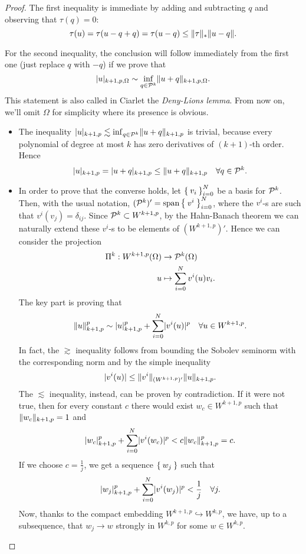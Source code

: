 \begin{proof}
The first inequality is immediate by adding and subtracting $q$ and observing that $\tau(q)=0$:
\[
\tau(u) = \tau(u-q+q) = \tau(u-q) \le \norm{\tau}_* \norm{u-q}.
\]

For the second inequality, the conclusion will follow immediately from the first one (just replace $q$ with $-q$) if we prove that
\[
\abs{u}_{k+1,p,\Omega} \sim \inf_{q \in \P^k} \norm{u+q}_{k+1,p,\Omega}.
\]
This statement is also called in Ciarlet \cite{ciarlet78} the \emph{Deny-Lions lemma}. From now on, we'll omit $\Omega$ for simplicity where its presence is obvious.
\begin{itemize}
\item The inequality $\abs{u}_{k+1,p} \lesssim \inf_{q \in \P^k} \norm{u+q}_{k+1,p}$ is trivial, because every polynomial of degree at most $k$ has zero derivatives of $(k+1)$-th order. Hence
\[
\abs{u}_{k+1,p} = \abs{u+q}_{k+1,p} \le \norm{u+q}_{k+1,p} \quad \forall q \in \P^k.
\]
\item In order to prove that the converse holds, let $\Set{v_i}_{i=0}^N$ be a basis for $\P^k$. Then, with the usual notation, $(\P^k)'=\Span\Set{v^i}_{i=0}^N$, where the $v^i$-s are such that $v^i(v_j)=\delta_{ij}$. Since $\P^k \subset W^{k+1,p}$, by the Hahn-Banach theorem we can naturally extend these $v^i$-s to be elements of $(W^{k+1,p})'$. Hence we can consider the projection
\begin{align}
\Pi^k:  W^{k+1,p}(\Omega) & \to \P^k(\Omega)\\
u & \mapsto \sum_{i=0}^N v^i(u) v_i.
\end{align}
The key part is proving that
\begin{equation}\label{eqn:deny-lions-exp}
\norm{u}_{k+1,p}^p \sim \abs{u}_{k+1,p}^p + \sum_{i=0}^N \abs{v^i(u)}^p \quad \forall u \in W^{k+1,p}.
\end{equation}
In fact, the $\gtrsim$ inequality follows from bounding the Sobolev seminorm with the corresponding norm and by the simple inequality
\[
\abs{v^i(u)} \le \norm{v^i}_{(W^{k+1,p})'} \norm{u}_{k+1,p}.
\]
The $\lesssim$ inequality, instead, can be proven by contradiction. If it were not true, then for every constant $c$ there would exist $w_c \in W^{k+1,p}$ such that $\norm{w_c}_{k+1,p} = 1$ and
\[
\abs{w_c}_{k+1,p}^p + \sum_{i=0}^N \abs{v^i(w_c)}^p < c \norm{w_c}_{k+1,p}^p = c.
\]
If we choose $c=\frac{1}{j}$, we get a sequence $\Set{w_j}$ such that
\begin{equation} \label{eqn:deny-lions-proof}
\abs{w_j}_{k+1,p}^p + \sum_{i=0}^N \abs{v^i(w_j)}^p < \frac{1}{j} \quad \forall j.
\end{equation}
Now, thanks to the compact embedding $W^{k+1,p} \hookrightarrow W^{k,p}$, we have, up to a subsequence, that $w_j \to w$ strongly in $W^{k,p}$ for some $w \in W^{k,p}$.


\end{itemize}
\end{proof}
